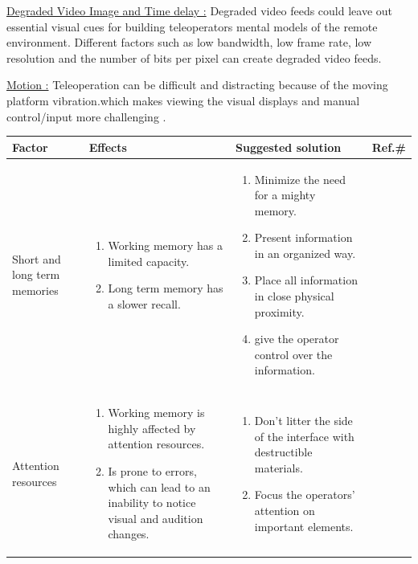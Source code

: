 \underline{Degraded Video Image and Time delay :}
Degraded video feeds could leave out essential visual cues for building teleoperators mental models of the remote environment. Different factors such as low bandwidth, low frame rate, low resolution and the number of bits per pixel can create degraded video feeds.

\underline{Motion :}
Teleoperation can be difficult and distracting because of the moving platform vibration.which makes viewing the visual displays and manual control/input more challenging \cite{schipani1998quantification}.

\begin{longtable}{p{2.5cm} p{5cm} p{5cm} p{1cm}}
    \hline
      \textbf{Factor} & \textbf{Effects} & \textbf{Suggested solution} & \textbf{Ref.\#}\\
            \hline
            \rowcolor{lightgray} 
           Short and long term memories &
           \begin{enumerate}
                \item Working memory has a limited capacity.
                \item Long term memory has a slower recall. 
           \end{enumerate} &
           \begin{enumerate}
           \item Minimize the need for a mighty memory.
           \item Present information in an organized way.
           \item Place all information in close physical proximity.
           \item give the operator control over the information.
           \end{enumerate}
             & 
            \cite{Bowman:2004:UIT:993837}\\
        \hline
          
                Attention resources &
                \begin{enumerate}
                    \item Working memory is highly affected by attention resources.
                    \item Is prone to errors, which can lead to an inability to notice visual and audition changes.
                \end{enumerate} &
                \begin{enumerate}
                \item Don't litter the side of the interface with destructible materials.
                \item Focus the operators’ attention on important elements.
                \end{enumerate} &
                \cite{SIMONS200516} \cite{Bowman:2004:UIT:993837} \cite{PMID:11540969}\\
                

\end{longtable}
